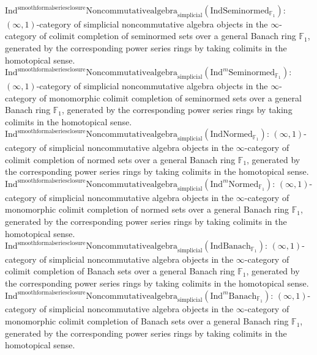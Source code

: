 \documentclass[11pt]{book}
\theoremstyle{definition}
\numberwithin{equation}{section}
\begin{document}
\noindent $\mathrm{Ind}^\text{smoothformalseriesclosure}\mathrm{Noncommutativealgebra}_{\mathrm{simplicial}}(\mathrm{Ind}\mathrm{Seminormed}_{\mathbb{F}_1})$: $(\infty,1)$-category of simplicial noncommutative algebra objects in the $\infty$-category of colimit completion of seminormed sets over a general Banach ring $\mathbb{F}_1$, generated by the corresponding power series rings by taking colimits in the homotopical sense. \\ 
\noindent $\mathrm{Ind}^\text{smoothformalseriesclosure}\mathrm{Noncommutativealgebra}_{\mathrm{simplicial}}(\mathrm{Ind}^m\mathrm{Seminormed}_{\mathbb{F}_1})$: $(\infty,1)$-category of simplicial noncommutative algebra objects in the $\infty$-category of monomorphic colimit completion of seminormed sets over a general Banach ring $\mathbb{F}_1$, generated by the corresponding power series rings by taking colimits in the homotopical sense. \\ 
\noindent $\mathrm{Ind}^\text{smoothformalseriesclosure}\mathrm{Noncommutativealgebra}_{\mathrm{simplicial}}(\mathrm{Ind}\mathrm{Normed}_{\mathbb{F}_1})$: $(\infty,1)$-category of simplicial noncommutative algebra objects in the $\infty$-category of colimit completion of normed sets over a general Banach ring $\mathbb{F}_1$, generated by the corresponding power series rings by taking colimits in the homotopical sense. \\ 
\noindent $\mathrm{Ind}^\text{smoothformalseriesclosure}\mathrm{Noncommutativealgebra}_{\mathrm{simplicial}}(\mathrm{Ind}^m\mathrm{Normed}_{\mathbb{F}_1})$: $(\infty,1)$-category of simplicial noncommutative algebra objects in the $\infty$-category of monomorphic colimit completion of normed sets over a general Banach ring $\mathbb{F}_1$, generated by the corresponding power series rings by taking colimits in the homotopical sense. \\ 
\noindent $\mathrm{Ind}^\text{smoothformalseriesclosure}\mathrm{Noncommutativealgebra}_{\mathrm{simplicial}}(\mathrm{Ind}\mathrm{Banach}_{\mathbb{F}_1})$: $(\infty,1)$-category of simplicial noncommutative algebra objects in the $\infty$-category of colimit completion of Banach sets over a general Banach ring $\mathbb{F}_1$, generated by the corresponding power series rings by taking colimits in the homotopical sense. \\ 
\noindent $\mathrm{Ind}^\text{smoothformalseriesclosure}\mathrm{Noncommutativealgebra}_{\mathrm{simplicial}}(\mathrm{Ind}^m\mathrm{Banach}_{\mathbb{F}_1})$: $(\infty,1)$-category of simplicial noncommutative algebra objects in the $\infty$-category of monomorphic colimit completion of Banach sets over a general Banach ring $\mathbb{F}_1$, generated by the corresponding power series rings by taking colimits in the homotopical sense. \\
\end{document}
